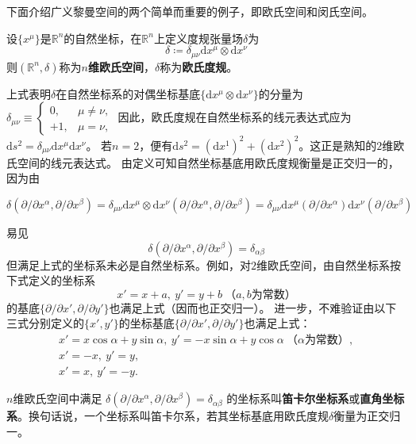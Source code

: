 下面介绍广义黎曼空间的两个简单而重要的例子，即欧氏空间和闵氏空间。

\begin{definition}
设$\{x^\mu\}$是$\mathbb{R}^n$的自然坐标，在$\mathbb{R}^n$上定义度规张量场$\delta$为
$$\delta \coloneq \delta_{\mu\nu}\mathrm{d}x^\mu\otimes\mathrm{d}x^\nu$$
则$(\mathbb{R}^n, \delta)$称为\textbf{$n$维欧氏空间}，$\delta$称为\textbf{欧氏度规}。
\end{definition}

上式表明$\delta$在自然坐标系的对偶坐标基底$\{\mathrm{d}x^\mu\otimes\mathrm{d}x^\nu\}$的分量为
$
\delta_{\mu\nu} \equiv
\begin{cases}
0, & \mu \neq \nu, \\
+1, & \mu = \nu,
\end{cases}
$
因此，欧氏度规在自然坐标系的线元表达式应为$\mathrm{d}s^2 = \delta_{\mu\nu}\mathrm{d}x^\mu\mathrm{d}x^\nu$。
若$n = 2$，便有$\mathrm{d}s^2 = (\mathrm{d}x^1)^2 + (\mathrm{d}x^2)^2$。这正是熟知的$2$维欧氏空间的线元表达式。
由定义可知自然坐标基底用欧氏度规衡量是正交归一的，因为由

$\delta(\partial / \partial x^\alpha, \partial / \partial x^\beta) = \delta_{\mu\nu}\mathrm{d}x^\mu\otimes\mathrm{d}x^\nu(\partial / \partial  x^\alpha, \partial / \partial x^\beta) = \delta_{\mu\nu}\mathrm{d}x^\mu(\partial / \partial x^\alpha)\mathrm{d}x^\nu(\partial / \partial x^\beta)$

易见$$\delta(\partial / \partial x^\alpha, \partial / \partial x^\beta) = \delta_{\alpha\beta}$$
但满足上式的坐标系未必是自然坐标系。例如，对$2$维欧氏空间，由自然坐标系按下式定义的坐标系
$$x' = x + a, ~ y' = y +b ~ \text{（$a, b$为常数）}$$
的基底$\{\partial / \partial x', \partial / \partial y'\}$也满足上式（因而也正交归一）。
进一步，不难验证由以下三式分别定义的$\{x', y'\}$的坐标基底$\{\partial / \partial x', \partial / \partial y'\}$也满足上式：
\begin{gather*}
x' = x\cos\alpha + y\sin\alpha, ~ y' = -x\sin\alpha + y\cos\alpha ~ \text{（$\alpha$为常数）}, \\
x' = -x, ~ y' = y, \\
x' = x, ~ y' = -y.
\end{gather*}

\begin{definition}
$n$维欧氏空间中满足
$\delta(\partial / \partial x^\alpha, \partial / \partial x^\beta) = \delta_{\alpha\beta}$
的坐标系叫\textbf{笛卡尔坐标系}或\textbf{直角坐标系}。换句话说，一个坐标系叫笛卡尔系，若其坐标基底用欧氏度规$\delta$衡量为正交归一。
\end{definition}

